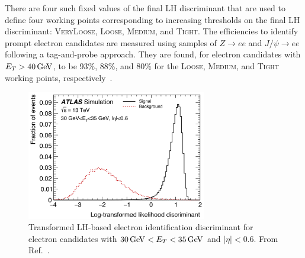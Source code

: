 There are four such fixed values of the final LH discriminant that are used to define
four working points corresponding to increasing thresholds on the final LH discriminant:
\textsc{VeryLoose}, \textsc{Loose}, \textsc{Medium}, and \textsc{Tight}.
The efficiencies to identify prompt electron candidates are measured using samples of $Z\rightarrow ee$ and
$J/\psi \rightarrow ee$ following a tag-and-probe approach.
They are found, for electron candidates with $E_T > 40\,\text{Ge\kern -0.1em V}$,
to be 93\%, 88\%, and 80\% for the \textsc{Loose}, \textsc{Medium}, and \textsc{Tight} working points, respectively~\cite{Aad:2019tso}.

\begin{figure}[!htb]
    \begin{center}
    \includegraphics[width=0.7\textwidth]{figures/chapter3/egamma/egamma_lh_discriminant}
    \caption{
        Transformed LH-based electron identification discriminant for electron candidates
        with $30\,\text{Ge\kern -0.1em V} < E_T < 35\,\text{Ge\kern -0.1em V}$ and $\lvert \eta \rvert < 0.6$.
        From Ref.~\cite{Aad:2019tso}.
    }
    \label{fig:egamma_lh_discriminant}
    \end{center}
\end{figure}


\FloatBarrier

